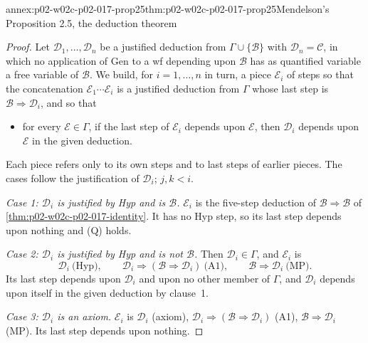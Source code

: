 \begin{annexitem}{annex:p02-w02c-p02-017-prop25}{thm:p02-w02c-p02-017-prop25}{Mendelson's Proposition 2.5, the deduction theorem}
\begin{proof}
Let \(\mathscr D_1,\ldots,\mathscr D_n\) be a justified deduction from
\(\Gamma\cup\{\mathscr B\}\) with \(\mathscr D_n=\mathscr C\), in which no
application of Gen to a wf depending upon \(\mathscr B\) has as quantified
variable a free variable of \(\mathscr B\).  We build, for
\(i=1,\ldots,n\) in turn, a piece \(\mathcal E_i\) of steps so that the
concatenation \(\mathcal E_1\cdots\mathcal E_i\) is a justified deduction from
\(\Gamma\) whose last step is \(\mathscr B\Rightarrow\mathscr D_i\), and so
that
\begin{itemize}
  \item[(Q)] for every \(\mathscr E\in\Gamma\), if the last step of
        \(\mathcal E_i\) depends upon \(\mathscr E\), then \(\mathscr D_i\)
        depends upon \(\mathscr E\) in the given deduction.
\end{itemize}
Each piece refers only to its own steps and to last steps of earlier pieces.
The cases follow the justification of \(\mathscr D_i\); \(j,k<i\).

\emph{Case 1: \(\mathscr D_i\) is justified by Hyp and is \(\mathscr B\).}
\(\mathcal E_i\) is the five-step deduction of
\(\mathscr B\Rightarrow\mathscr B\) of
\cref{thm:p02-w02c-p02-017-identity}.  It has no Hyp step, so its last step
depends upon nothing and (Q) holds.

\emph{Case 2: \(\mathscr D_i\) is justified by Hyp and is not
\(\mathscr B\).}  Then \(\mathscr D_i\in\Gamma\), and \(\mathcal E_i\) is
\[
 \mathscr D_i\ \text{(Hyp)},\qquad
 \mathscr D_i\Rightarrow(\mathscr B\Rightarrow\mathscr D_i)\ \text{(A1)},\qquad
 \mathscr B\Rightarrow\mathscr D_i\ \text{(MP)}.
\]
Its last step depends upon \(\mathscr D_i\) and upon no other member of
\(\Gamma\), and \(\mathscr D_i\) depends upon itself in the given deduction
by clause~1.

\emph{Case 3: \(\mathscr D_i\) is an axiom.}  \(\mathcal E_i\) is
\(\mathscr D_i\) (axiom),
\(\mathscr D_i\Rightarrow(\mathscr B\Rightarrow\mathscr D_i)\) (A1),
\(\mathscr B\Rightarrow\mathscr D_i\) (MP).  Its last step depends upon
nothing.


\end{proof}
\end{annexitem}
